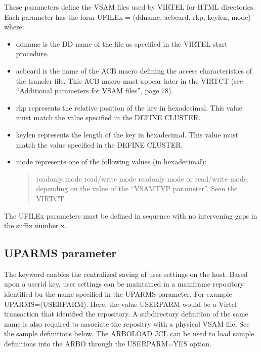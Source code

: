 \documentclass[letterpaper,10pt,english]{sphinxmanual}
\begin{document}
\sphinxAtStartPar
These parameters define the VSAM files used by VIRTEL for HTML directories. Each parameter has the form UFILEx = (ddname, acbcard, rkp, keylen, mode) where:
\begin{itemize}
\item {} 
\sphinxAtStartPar
ddname is the DD name of the file as specified in the VIRTEL start procedure.

\item {} 
\sphinxAtStartPar
acbcard is the name of the ACB macro defining the access characteristics of the transfer file. This ACB macro must appear later in the VIRTCT (see “Additional parameters for VSAM files”, page 78).

\item {} 
\sphinxAtStartPar
rkp represents the relative position of the key in hexadecimal. This value must match the value specified in the DEFINE CLUSTER.

\item {} 
\sphinxAtStartPar
keylen represents the length of the key in hexadecimal. This value must match the value specified in the DEFINE CLUSTER.

\item {} 
\sphinxAtStartPar
mode represents one of the following values (in hexadecimal):
\begin{quote}

\sphinxAtStartPar
{} \sphinxhyphen{} read\sphinxhyphen{}only mode
 \sphinxhyphen{} read/write mode
 \sphinxhyphen{} read\sphinxhyphen{}only mode or read/write mode, depending on the value of the “VSAMTYP parameter”. Seen the VIRTCT.
\end{quote}

\end{itemize}

\sphinxAtStartPar
The UFILEx parameters must be defined in sequence with no intervening gaps in the suffix number x.

\ignorespaces 

\subsection{UPARMS parameter}
\label{\detokenize{Installation_Guide:uparms-parameter}}\label{\detokenize{Installation_Guide:index-135}}
\sphinxAtStartPar
The keyword enables the centralized saving of user settings on the host. Based upon a userid key, user settings can be maintained in a mainframe repository identified bu the name specified in the UPARMS parameter. For example UPARMS=(USERPARM). Here, the value USERPARM would be a Virtel transaction that identfied the repository. A sub\sphinxhyphen{}directory definition of the same name is also required to aasociate the repositry with a physical VSAM file. See the sample definitions below. The ARBOLOAD JCL can be used to load sample definitions into the ARBO through the USERPARM=YES option.
\end{document}
